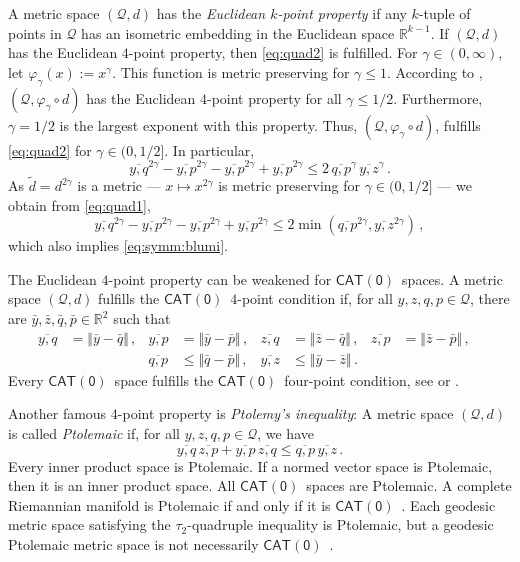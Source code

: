 \documentclass{article}
\newcommand{\lb}{\left(} %
\newcommand{\rb}{\right)} %
\newcommand{\br}[1]{\lb #1 \rb} %
\newcommand{\brOf}[1]{\!\br{#1}} %
\newcommand*{\mc}[1]{\mathcal{#1}}
\newcommand*{\ms}[1]{\mathsf{#1}}
\newcommand{\R}{\mathbb{R}}
\newcommand{\Rpp}{(0, \infty)} %
\newcommand{\normof}[1]{\Vert #1 \Vert}
\newcommand{\equationFullstop}{\, .}
\newcommand{\eqfs}{\equationFullstop}
\newcommand{\equationComma}{\, ,}
\newcommand{\eqcm}{\equationComma}
\newcommand{\ol}[2]{\overline{#1,#2}}
\newcommand{\cato}{$\ms{CAT(0)}$}
\newcommand{\mtr}{\varphi}
\newcommand{\tran}{\tau}
\begin{document}
A metric space $(\mc Q, d)$ has the \textit{Euclidean $k$-point property} \cite[Definition 50.1]{blumenthal70} if any $k$-tuple of points in $\mc Q$ has an isometric embedding in the Euclidean space $\R^{k-1}$. If $(\mc Q, d)$ has the Euclidean $4$-point property, then \eqref{eq:quad2} is fulfilled. For $\gamma\in\Rpp$, let $\mtr_\gamma(x) := x^\gamma$. This function is metric preserving for $\gamma \leq 1$. According to \cite[Theorem 52.1]{blumenthal70}, $(\mc Q, \mtr_\gamma \circ d)$ has the Euclidean $4$-point property for all $\gamma \leq 1/2$. Furthermore, $\gamma = 1/2$ is the largest exponent with this property. Thus, $(\mc Q, \mtr_\gamma \circ d)$, fulfills \eqref{eq:quad2} for $\gamma\in(0,1/2]$. In particular,
\begin{equation}\label{eq:symm:blumi}
	\ol yq^{2\gamma} - \ol yp^{2\gamma} - \ol yp^{2\gamma} + \ol yp^{2\gamma} \leq 2 \,\ol qp^\gamma \,\ol yz^\gamma
	\eqfs
\end{equation}
As $\tilde d = d^{2\gamma}$ is a metric --- $x\mapsto x^{2\gamma}$ is metric preserving for $\gamma\in(0,1/2]$ --- we obtain from \eqref{eq:quad1},
\begin{equation}
	\ol yq^{2\gamma} - \ol yp^{2\gamma} - \ol yp^{2\gamma} + \ol yp^{2\gamma} \leq 2 \min\brOf{\ol qp^{2\gamma}, \ol yz^{2\gamma}}
	\eqcm
\end{equation}
which also implies \eqref{eq:symm:blumi}.

The Euclidean $4$-point property can be weakened for \cato\ spaces. A metric space $(\mc Q, d)$ fulfills the \cato\ $4$-point condition \cite[Definition II.1.10]{bridson99} if, for all $y,z,q,p\in\mc Q$, there are $\bar y,\bar z,\bar q,\bar p\in\R^2$ such that 
\begin{align*}
	\ol yq	&= \normof{\bar y - \bar q}\eqcm &
	\ol yp	&= \normof{\bar y - \bar p}\eqcm &
	\ol zq	&= \normof{\bar z - \bar q}\eqcm &
	\ol zp	&= \normof{\bar z - \bar p}\eqcm &
	\\
	&&
	\ol qp	&\leq \normof{\bar q - \bar p}\eqcm &
	\ol yz	&\leq \normof{\bar y - \bar z}\eqfs &
	&&
\end{align*}
%
Every \cato\ space fulfills the \cato\ four-point condition, see \cite{reshetnyak68} or \cite[Proposition II.1.11]{bridson99}. 

Another famous $4$-point property is \textit{Ptolemy's inequality}: A metric space $(\mc Q, d)$ is called \textit{Ptolemaic} if, for all $y,z, q,p\in\mc Q$, we have
\begin{equation}\label{eq:ptolemy}
	\ol yq \, \ol zp + \ol yp\, \ol zq \leq \ol qp \, \ol yz 
	\eqfs
\end{equation}
Every inner product space is Ptolemaic. If a normed vector space is Ptolemaic, then it is an inner product space. All \cato\ spaces are Ptolemaic. A complete Riemannian manifold is Ptolemaic if and only if it is \cato\ \cite[Theorem 1.1]{buckley09}. Each geodesic metric space satisfying the $\tran_2$-quadruple inequality is Ptolemaic, but a geodesic Ptolemaic metric space is not necessarily \cato\ \cite{foertsch07,berg08}.
\end{document}
